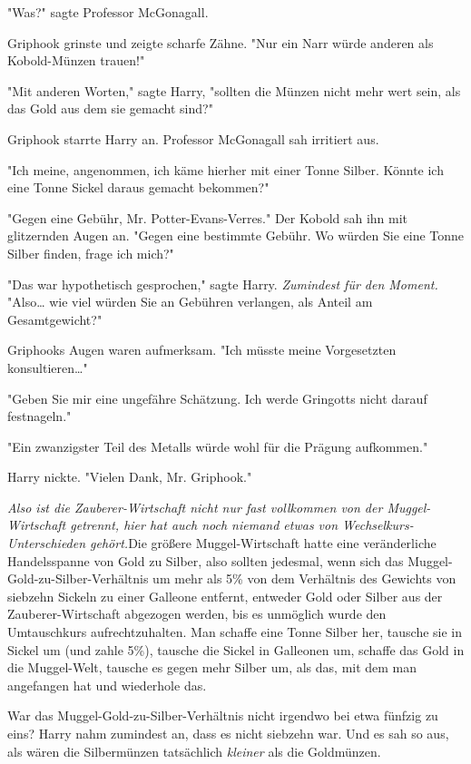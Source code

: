 {"Was?" sagte Professor McGonagall.

Griphook grinste und zeigte scharfe Zähne. "Nur ein Narr würde anderen als Kobold-Münzen trauen!"

"Mit anderen Worten," sagte Harry, "sollten die Münzen nicht mehr wert sein, als das Gold aus dem sie gemacht sind?"

Griphook starrte Harry an. Professor McGonagall sah irritiert aus.

"Ich meine, angenommen, ich käme hierher mit einer Tonne Silber. Könnte ich eine Tonne Sickel daraus gemacht bekommen?"

"Gegen eine Gebühr, Mr. Potter-Evans-Verres." Der Kobold sah ihn mit glitzernden Augen an. "Gegen eine bestimmte Gebühr. Wo würden Sie eine Tonne Silber finden, frage ich mich?"

"Das war hypothetisch gesprochen," sagte Harry. \emph{Zumindest für den Moment.} "Also… wie viel würden Sie an Gebühren verlangen, als Anteil am Gesamtgewicht?"

Griphooks Augen waren aufmerksam. "Ich müsste meine Vorgesetzten konsultieren…"

"Geben Sie mir eine ungefähre Schätzung. Ich werde Gringotts nicht darauf festnageln."

"Ein zwanzigster Teil des Metalls würde wohl für die Prägung aufkommen."

Harry nickte. "Vielen Dank, Mr. Griphook."

\emph{Also ist die Zauberer-Wirtschaft nicht nur fast vollkommen von der Muggel-Wirtschaft getrennt, hier hat auch noch niemand etwas von Wechselkurs-Unterschieden gehört.}Die größere Muggel-Wirtschaft hatte eine veränderliche Handelsspanne von Gold zu Silber, also sollten jedesmal, wenn sich das Muggel-Gold-zu-Silber-Verhältnis um mehr als 5\% von dem Verhältnis des Gewichts von siebzehn Sickeln zu einer Galleone entfernt, entweder Gold oder Silber aus der Zauberer-Wirtschaft abgezogen werden, bis es unmöglich wurde den Umtauschkurs aufrechtzuhalten. Man schaffe eine Tonne Silber her, tausche sie in Sickel um (und zahle 5\%), tausche die Sickel in Galleonen um, schaffe das Gold in die Muggel-Welt, tausche es gegen mehr Silber um, als das, mit dem man angefangen hat und wiederhole das.

War das Muggel-Gold-zu-Silber-Verhältnis nicht irgendwo bei etwa fünfzig zu eins? Harry nahm zumindest an, dass es nicht siebzehn war. Und es sah so aus, als wären die Silbermünzen tatsächlich \emph{kleiner} als die Goldmünzen.

}
